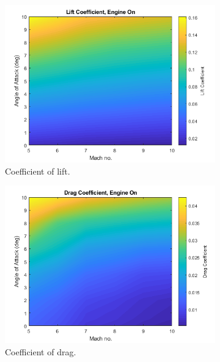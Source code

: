 		\begin{figure}[!ht]
			\begin{subfigure}{.5\textwidth}
				\centering
				\includegraphics[width=0.99\linewidth]{figures/3_vehicle_design/Cl-EngineOn}
				\caption{Coefficient of lift.}
				\label{fig:Cl-EngineOn}
			\end{subfigure}
			\begin{subfigure}{.5\textwidth}
				\centering
				\includegraphics[width=0.99\linewidth]{figures/3_vehicle_design/Cd-EngineOn}
				\caption{Coefficient of drag.}
				\label{fig:Cd-EngineOn}
			\end{subfigure}
			\begin{subfigure}{.5\textwidth}
				\centering

\end{subfigure}
\end{figure}
